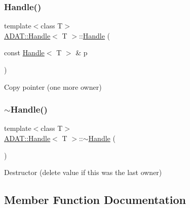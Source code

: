 \subsubsection{\texorpdfstring{Handle()}{Handle()}\hspace{0.1cm}{\footnotesize\ttfamily [4/4]}}
{\footnotesize\ttfamily template$<$class T$>$ \\
\mbox{\hyperlink{classADAT_1_1Handle}{A\+D\+A\+T\+::\+Handle}}$<$ T $>$\+::\mbox{\hyperlink{classADAT_1_1Handle}{Handle}} (\begin{DoxyParamCaption}\item[{const \mbox{\hyperlink{classADAT_1_1Handle}{Handle}}$<$ T $>$ \&}]{p }\end{DoxyParamCaption})\hspace{0.3cm}{\ttfamily [inline]}}



Copy pointer (one more owner) 

\mbox{\label{classADAT_1_1Handle_a358ca2d3df9674e7ccb416574df96ce5}} 
\subsubsection{\texorpdfstring{$\sim$Handle()}{~Handle()}\hspace{0.1cm}{\footnotesize\ttfamily [2/2]}}
{\footnotesize\ttfamily template$<$class T$>$ \\
\mbox{\hyperlink{classADAT_1_1Handle}{A\+D\+A\+T\+::\+Handle}}$<$ T $>$\+::$\sim$\mbox{\hyperlink{classADAT_1_1Handle}{Handle}} (\begin{DoxyParamCaption}{ }\end{DoxyParamCaption})\hspace{0.3cm}{\ttfamily [inline]}}



Destructor (delete value if this was the last owner) 



\subsection{Member Function Documentation}
\mbox{\label{classADAT_1_1Handle_aac9634a0530419244ef076e63ff2b984}} 
